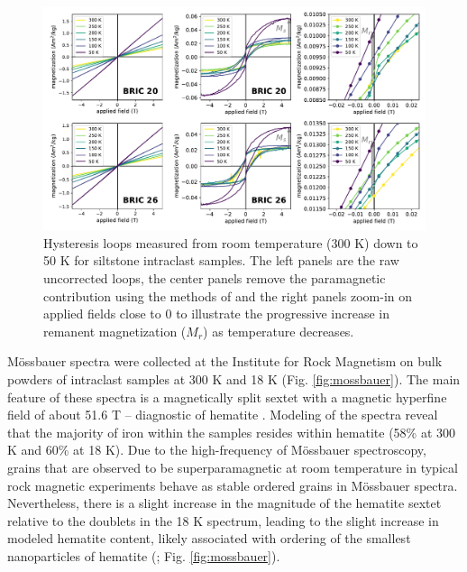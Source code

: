 \documentclass[draft]{agujournal2019}
\begin{document}
\begin{figure}[!ht]
\noindent\includegraphics[width=\textwidth]{Fig6_low_temp_loops.pdf}
\caption{\small{Hysteresis loops measured from room temperature (300 K) down to 50 K for siltstone intraclast samples. The left panels are the raw uncorrected loops, the center panels remove the paramagnetic contribution using the methods of  and the right panels zoom-in on applied fields close to 0 to illustrate the progressive increase in remanent magnetization ($M_r$) as temperature decreases.}}
\label{fig:low_temp_loops}
\end{figure}
 
M{\"o}ssbauer spectra were collected at the Institute for Rock Magnetism on bulk powders of intraclast samples at 300 K and 18 K (Fig. \ref{fig:mossbauer}). The main feature of these spectra is a magnetically split sextet with a magnetic hyperfine field of about 51.6 T -- diagnostic of hematite \cite{Dyar2006a}. Modeling of the spectra reveal that the majority of iron within the samples resides within hematite (58\% at 300 K and 60\% at 18 K). Due to the high-frequency of M{\"o}ssbauer spectroscopy, grains that are observed to be superparamagnetic at room temperature in typical rock magnetic experiments behave as stable ordered grains in M{\"o}ssbauer spectra. Nevertheless, there is a slight increase in the magnitude of the hematite sextet relative to the doublets in the 18 K spectrum, leading to the slight increase in modeled hematite content, likely associated with ordering of the smallest nanoparticles of hematite (\cite{Bodker2000a}; Fig. \ref{fig:mossbauer}).
\end{document}
